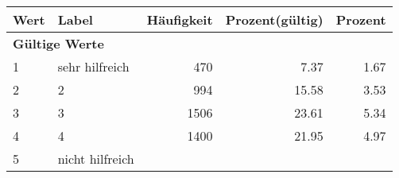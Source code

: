      \begin{longtable}{lXrrr}
     \toprule
     \textbf{Wert} & \textbf{Label} & \textbf{Häufigkeit} & \textbf{Prozent(gültig)} & \textbf{Prozent} \\
     \endhead
     \midrule
     \multicolumn{5}{l}{\textbf{Gültige Werte}}\\

     1 &
     \multicolumn{1}{X}{ sehr hilfreich   } &


       \num{470} &
       \num[round-mode=places,round-precision=2]{7.37} &
         \num[round-mode=places,round-precision=2]{1.67} \\

     2 &
     \multicolumn{1}{X}{ 2   } &


       \num{994} &
       \num[round-mode=places,round-precision=2]{15.58} &
         \num[round-mode=places,round-precision=2]{3.53} \\

     3 &
     \multicolumn{1}{X}{ 3   } &


       \num{1506} &
       \num[round-mode=places,round-precision=2]{23.61} &
         \num[round-mode=places,round-precision=2]{5.34} \\

     4 &
     \multicolumn{1}{X}{ 4   } &


       \num{1400} &
       \num[round-mode=places,round-precision=2]{21.95} &
         \num[round-mode=places,round-precision=2]{4.97} \\

     5 &
     \multicolumn{1}{X}{ nicht hilfreich   } &



\end{longtable}
